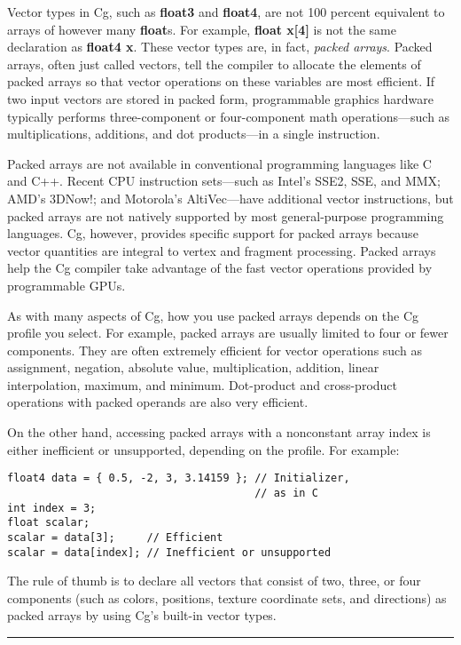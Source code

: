 \documentclass[../main.tex]{subfiles}
\begin{document}
Vector types in Cg, such as \textbf{float3} and \textbf{float4}, are not 100 percent equivalent to arrays of however many \textbf{float}s. For example, \textbf{float x[4]} is not the same declaration as \textbf{float4 x}. These vector types are, in fact, \textit{packed arrays}. Packed arrays, often just called vectors, tell the compiler to allocate the elements of packed arrays so that vector operations on these variables are most efficient. If two input vectors are stored in packed form, programmable graphics hardware typically performs three-component or four-component math operations—such as multiplications, additions, and dot products—in a single instruction.

Packed arrays are not available in conventional programming languages like C and C++. Recent CPU instruction sets—such as Intel's SSE2, SSE, and MMX; AMD's 3DNow!; and Motorola's AltiVec—have additional vector instructions, but packed arrays are not natively supported by most general-purpose programming languages. Cg, however, provides specific support for packed arrays because vector quantities are integral to vertex and fragment processing. Packed arrays help the Cg compiler take advantage of the fast vector operations provided by programmable GPUs.

As with many aspects of Cg, how you use packed arrays depends on the Cg profile you select. For example, packed arrays are usually limited to four or fewer components. They are often extremely efficient for vector operations such as assignment, negation, absolute value, multiplication, addition, linear interpolation, maximum, and minimum. Dot-product and cross-product operations with packed operands are also very efficient.

On the other hand, accessing packed arrays with a nonconstant array index is either inefficient or unsupported, depending on the profile. For example:

\FloatBarrier
\begin{lstlisting}
float4 data = { 0.5, -2, 3, 3.14159 }; // Initializer,
                                       // as in C
int index = 3;
float scalar;
scalar = data[3];     // Efficient
scalar = data[index]; // Inefficient or unsupported
\end{lstlisting}
\FloatBarrier

The rule of thumb is to declare all vectors that consist of two, three, or four components (such as colors, positions, texture coordinate sets, and directions) as packed arrays by using Cg's built-in vector types.
\hrule
\end{document}

